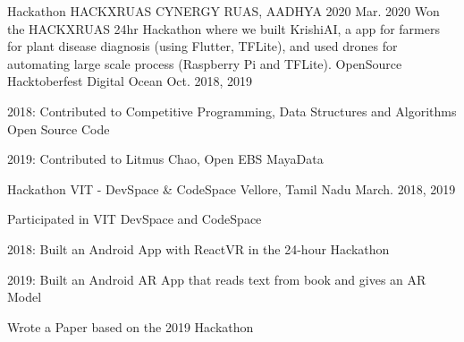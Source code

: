 \begin{cventries}
    \cventry
        {Hackathon}
        {HACKXRUAS}
        {CYNERGY RUAS, AADHYA 2020}
        {Mar. 2020}
        {
            Won the HACKXRUAS 24hr Hackathon where we built KrishiAI, a app for farmers for plant disease diagnosis (using Flutter, TFLite), and used drones for automating large scale process (Raspberry Pi and TFLite).
        }
    \cventry
        {OpenSource}
        {Hacktoberfest}
        {Digital Ocean}
        {Oct. 2018, 2019}
        {
            \begin{cvitems}
                \item {2018: Contributed to Competitive Programming, Data Structures and Algorithms Open Source Code}
                \item {2019: Contributed to Litmus Chao, Open EBS MayaData}
            \end{cvitems}
        }
    \cventry
        {Hackathon}
        {VIT - DevSpace \& CodeSpace}
        {Vellore, Tamil Nadu}
        {March. 2018, 2019}
        {
            \begin{cvitems}
                \item {Participated in VIT DevSpace and CodeSpace}
                \item {2018: Built an Android App with ReactVR in the 24-hour Hackathon}
                \item {2019: Built an Android AR App that reads text from book and gives an AR Model}
                \item {Wrote a Paper based on the 2019 Hackathon}
            \end{cvitems}
        }
\end{cventries}